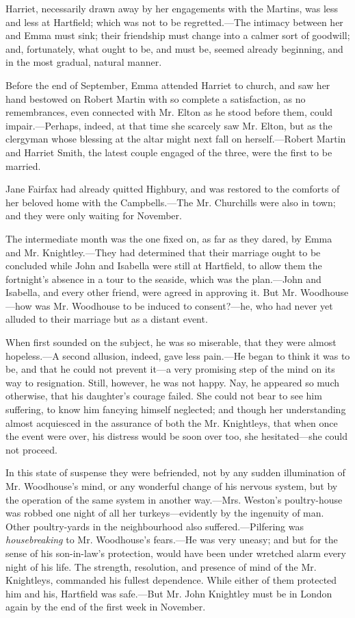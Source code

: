Harriet, necessarily drawn away by her engagements with the Martins, was less and less at Hartfield; which was not to be regretted.---The intimacy between her and Emma must sink; their friendship must change into a calmer sort of goodwill; and, fortunately, what ought to be, and must be, seemed already beginning, and in the most gradual, natural manner.

Before the end of September, Emma attended Harriet to church, and saw her hand bestowed on Robert Martin with so complete a satisfaction, as no remembrances, even connected with Mr. Elton as he stood before them, could impair.---Perhaps, indeed, at that time she scarcely saw Mr. Elton, but as the clergyman whose blessing at the altar might next fall on herself.---Robert Martin and Harriet Smith, the latest couple engaged of the three, were the first to be married.

Jane Fairfax had already quitted Highbury, and was restored to the comforts of her beloved home with the Campbells.---The Mr. Churchills were also in town; and they were only waiting for November.

The intermediate month was the one fixed on, as far as they dared, by Emma and Mr. Knightley.---They had determined that their marriage ought to be concluded while John and Isabella were still at Hartfield, to allow them the fortnight's absence in a tour to the seaside, which was the plan.---John and Isabella, and every other friend, were agreed in approving it. But Mr. Woodhouse---how was Mr. Woodhouse to be induced to consent?---he, who had never yet alluded to their marriage but as a distant event.

When first sounded on the subject, he was so miserable, that they were almost hopeless.---A second allusion, indeed, gave less pain.---He began to think it was to be, and that he could not prevent it---a very promising step of the mind on its way to resignation. Still, however, he was not happy. Nay, he appeared so much otherwise, that his daughter's courage failed. She could not bear to see him suffering, to know him fancying himself neglected; and though her understanding almost acquiesced in the assurance of both the Mr. Knightleys, that when once the event were over, his distress would be soon over too, she hesitated---she could not proceed.

In this state of suspense they were befriended, not by any sudden illumination of Mr. Woodhouse's mind, or any wonderful change of his nervous system, but by the operation of the same system in another way.---Mrs. Weston's poultry-house was robbed one night of all her turkeys---evidently by the ingenuity of man. Other poultry-yards in the neighbourhood also suffered.---Pilfering was {\em housebreaking} to Mr. Woodhouse's fears.---He was very uneasy; and but for the sense of his son-in-law's protection, would have been under wretched alarm every night of his life. The strength, resolution, and presence of mind of the Mr. Knightleys, commanded his fullest dependence. While either of them protected him and his, Hartfield was safe.---But Mr. John Knightley must be in London again by the end of the first week in November.

